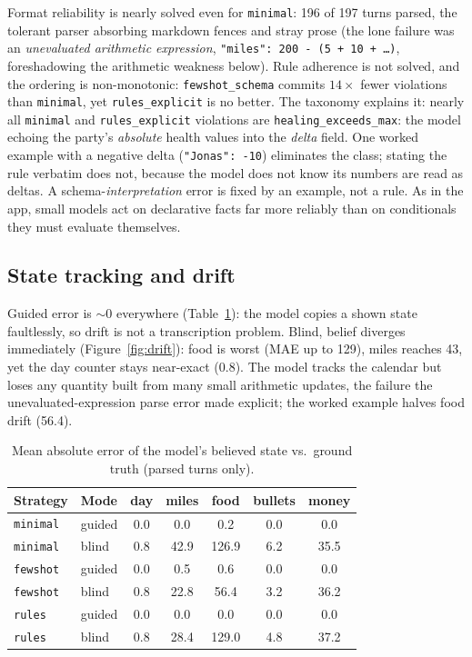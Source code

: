 \documentclass{article}
\begin{document}
Format reliability is nearly solved even for \texttt{minimal}: 196 of 197 turns parsed,
the tolerant parser absorbing markdown fences and stray prose (the lone failure was an
\emph{unevaluated arithmetic expression}, \mbox{\texttt{"miles": 200 - (5 + 10 + \ldots)}},
foreshadowing the arithmetic weakness below). Rule adherence is not solved, and the
ordering is non-monotonic: \texttt{fewshot\_schema} commits $14\times$ fewer violations
than \texttt{minimal}, yet \texttt{rules\_explicit} is no better. The taxonomy explains it:
nearly all \texttt{minimal} and \texttt{rules\_explicit} violations are
\texttt{healing\_exceeds\_max}: the model echoing the party's \emph{absolute} health
values into the \emph{delta} field. One worked example with a negative delta
(\texttt{"Jonas": -10}) eliminates the class; stating the rule verbatim does not, because
the model does not know its numbers are read as deltas. A schema-\emph{interpretation}
error is fixed by an example, not a rule. As in the app, small models act on declarative
facts far more reliably than on conditionals they must evaluate themselves.

\subsection{State tracking and drift}
Guided error is $\sim$0 everywhere (Table~\ref{tab:state-tracking}): the model copies a
shown state faultlessly, so drift is not a transcription problem. Blind, belief diverges
immediately (Figure~\ref{fig:drift}): food is worst (MAE up to 129), miles reaches 43, yet
the day counter stays near-exact (0.8). The model tracks the calendar but loses any
quantity built from many small arithmetic updates, the failure the unevaluated-expression
parse error made explicit; the worked example halves food drift (56.4).
\begin{table}[t]
\caption{Mean absolute error of the model's believed state vs.\ ground truth (parsed turns only).}
\label{tab:state-tracking}
\centering
\small
\setlength{\tabcolsep}{3.4pt}
\begin{tabular}{llccccc}
\toprule
Strategy & Mode & day & miles & food & bullets & money \\
\midrule
\texttt{minimal} & guided & 0.0 & 0.0 & 0.2 & 0.0 & 0.0 \\
\texttt{minimal} & blind & 0.8 & 42.9 & 126.9 & 6.2 & 35.5 \\
\texttt{fewshot} & guided & 0.0 & 0.5 & 0.6 & 0.0 & 0.0 \\
\texttt{fewshot} & blind & 0.8 & 22.8 & 56.4 & 3.2 & 36.2 \\
\texttt{rules} & guided & 0.0 & 0.0 & 0.0 & 0.0 & 0.0 \\
\texttt{rules} & blind & 0.8 & 28.4 & 129.0 & 4.8 & 37.2 \\
\bottomrule
\end{tabular}
\end{table}
\end{document}
